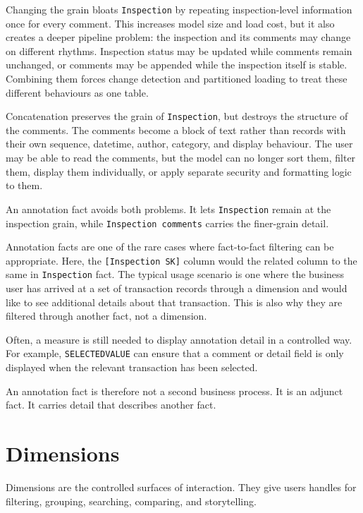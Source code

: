 \documentclass[10pt,openany,10pt]{book}
\begin{document}
Changing the grain bloats
\texttt{\textquotesingle{}Inspection\textquotesingle{}} by repeating
inspection-level information once for every comment. This increases
model size and load cost, but it also creates a deeper pipeline problem:
the inspection and its comments may change on different rhythms.
Inspection status may be updated while comments remain unchanged, or
comments may be appended while the inspection itself is stable.
Combining them forces change detection and partitioned loading to treat
these different behaviours as one table.

Concatenation preserves the grain of
\texttt{\textquotesingle{}Inspection\textquotesingle{}}, but destroys
the structure of the comments. The comments become a block of text
rather than records with their own sequence, datetime, author, category,
and display behaviour. The user may be able to read the comments, but
the model can no longer sort them, filter them, display them
individually, or apply separate security and formatting logic to them.

An annotation fact avoids both problems. It lets
\texttt{\textquotesingle{}Inspection\textquotesingle{}} remain at the
inspection grain, while
\texttt{\textquotesingle{}Inspection\ comments\textquotesingle{}}
carries the finer-grain detail.

Annotation facts are one of the rare cases where fact-to-fact filtering
can be appropriate. Here, the \texttt{{[}Inspection\ SK{]}} column would
the related column to the same in
\texttt{\textquotesingle{}Inspection\textquotesingle{}} fact. The
typical usage scenario is one where the business user has arrived at a
set of transaction records through a dimension and would like to see
additional details about that transaction. This is also why they are
filtered through another fact, not a dimension.

Often, a measure is still needed to display annotation detail in a
controlled way. For example, \texttt{SELECTEDVALUE} can ensure that a
comment or detail field is only displayed when the relevant transaction
has been selected.

An annotation fact is therefore not a second business process. It is an
adjunct fact. It carries detail that describes another fact.

\section{Dimensions}\label{dimensions-1}

Dimensions are the controlled surfaces of interaction. They give users
handles for filtering, grouping, searching, comparing, and storytelling.
\end{document}

